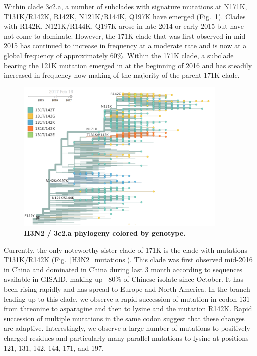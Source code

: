 \documentclass[11pt,oneside,letterpaper]{article}
\begin{document}
\pagebreak

Within clade 3c2.a, a number of subclades with signature mutations at N171K, T131K/R142K, R142K, N121K/R144K, Q197K have emerged (Fig.\ \ref{H3N2_tree}).
Clades with R142K, N121K/R144K, Q197K arose in late 2014 or early 2015 but have not come to dominate.
However, the 171K clade that was first observed in mid-2015 has continued to increase in frequency at a moderate rate and is now at a global frequency of approximately 60\%.
Within the 171K clade, a subclade bearing the 121K mutation emerged in at the beginning of 2016 and has steadily increased in frequency now making of the majority of the parent 171K clade.

\begin{figure}[H]
	\centering
	\includegraphics[width=0.9\textwidth]{../figures/feb-2017/H3N2_tree.png}
	\caption{\textbf{H3N2 / 3c2.a phylogeny colored by genotype.}
	}
	\label{H3N2_tree}
\end{figure}

Currently, the only noteworthy sister clade of 171K is the clade with mutations T131K/R142K (Fig.\ \ref{H3N2_mutations}).
This clade was first observed mid-2016 in China and dominated in China during last 3 month according to sequences available in GISAID, making up ~80\% of Chinese isolate since October.
It has been rising rapidly and has spread to Europe and North America.
In the branch leading up to this clade, we observe a rapid succession of mutation in codon 131 from threonine to asparagine and then to lysine and the mutation R142K.
Rapid succession of multiple mutations in the same codon suggest that these changes are adaptive.
Interestingly, we observe a large number of mutations to positively charged residues and particularly many parallel mutations to lysine at positions 121, 131, 142, 144, 171, and 197.
\end{document}
